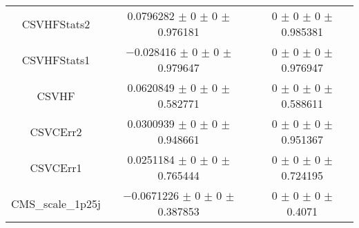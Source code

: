 \begin{table}
\begin{tabular}{ccc}
CSVHFStats2 	& \num{0.0796282} $\pm$ \num{0} $\pm$ \num{0} $\pm$ \num{0.976181} 	& \num{0} $\pm$ \num{0} $\pm$ \num{0} $\pm$ \num{0.985381}\\
CSVHFStats1 	& \num{-0.028416} $\pm$ \num{0} $\pm$ \num{0} $\pm$ \num{0.979647} 	& \num{0} $\pm$ \num{0} $\pm$ \num{0} $\pm$ \num{0.976947}\\
CSVHF 	& \num{0.0620849} $\pm$ \num{0} $\pm$ \num{0} $\pm$ \num{0.582771} 	& \num{0} $\pm$ \num{0} $\pm$ \num{0} $\pm$ \num{0.588611}\\
CSVCErr2 	& \num{0.0300939} $\pm$ \num{0} $\pm$ \num{0} $\pm$ \num{0.948661} 	& \num{0} $\pm$ \num{0} $\pm$ \num{0} $\pm$ \num{0.951367}\\
CSVCErr1 	& \num{0.0251184} $\pm$ \num{0} $\pm$ \num{0} $\pm$ \num{0.765444} 	& \num{0} $\pm$ \num{0} $\pm$ \num{0} $\pm$ \num{0.724195}\\
CMS\_scale\_1p25j 	& \num{-0.0671226} $\pm$ \num{0} $\pm$ \num{0} $\pm$ \num{0.387853} 	& \num{0} $\pm$ \num{0} $\pm$ \num{0} $\pm$ \num{0.4071}\\
\bottomrule
\end{tabular}
\end{table}